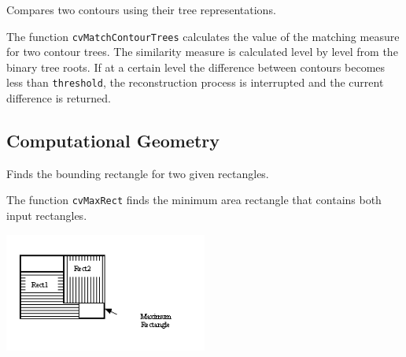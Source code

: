 \label{MatchContourTrees}

Compares two contours using their tree representations.


\begin{description}
\end{description}

The function \texttt{cvMatchContourTrees} calculates the value of the matching measure for two contour trees. The similarity measure is calculated level by level from the binary tree roots. If at a certain level the difference between contours becomes less than \texttt{threshold}, the reconstruction process is interrupted and the current difference is returned.

\subsection{Computational Geometry}

\label{MaxRect}

Finds the bounding rectangle for two given rectangles.


\begin{description}
\end{description}

The function \texttt{cvMaxRect} finds the minimum area rectangle that contains both input rectangles.

\includegraphics[width=0.5\textwidth]{pics/maxrect.png}


